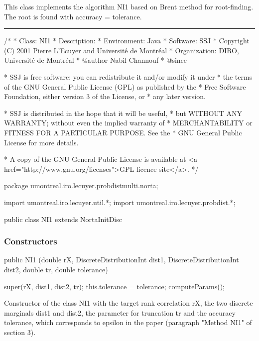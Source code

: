  This class implements the algorithm NI1 based on Brent method for
root-finding. The root is found with accuracy = tolerance.
\bigskip\hrule

\begin{code}
\begin{hide}
/*
 * Class:        NI1
 * Description:
 * Environment:  Java
 * Software:     SSJ
 * Copyright (C) 2001  Pierre L'Ecuyer and Université de Montréal
 * Organization: DIRO, Université de Montréal
 * @author       Nabil Channouf
 * @since

 * SSJ is free software: you can redistribute it and/or modify it under
 * the terms of the GNU General Public License (GPL) as published by the
 * Free Software Foundation, either version 3 of the License, or
 * any later version.

 * SSJ is distributed in the hope that it will be useful,
 * but WITHOUT ANY WARRANTY; without even the implied warranty of
 * MERCHANTABILITY or FITNESS FOR A PARTICULAR PURPOSE.  See the
 * GNU General Public License for more details.

 * A copy of the GNU General Public License is available at
   <a href="http://www.gnu.org/licenses">GPL licence site</a>.
 */
\end{hide}
package umontreal.iro.lecuyer.probdistmulti.norta;
\begin{hide}
import umontreal.iro.lecuyer.util.*;
import umontreal.iro.lecuyer.probdist.*;
\end{hide}

public class NI1 extends NortaInitDisc\begin{hide}
{
   private double tolerance; /* Desired accuracy for the root-finder
   				 algorithm (epsilon in paragraph
   				 "Method NI1" of section 3 in the paper).*/
\end{hide}
\end{code}
\subsubsection* {Constructors}

\begin{code}

   public NI1 (double rX, DiscreteDistributionInt dist1,
               DiscreteDistributionInt dist2, double tr, double tolerance)\begin{hide}
   {
      super(rX, dist1, dist2, tr);
      this.tolerance = tolerance;
      computeParams();
   }\end{hide}
\end{code}
\begin{tabb}
Constructor of the class NI1 with the target rank correlation rX,
       the two discrete marginals dist1 and dist2,
       the parameter for truncation tr and the accuracy tolerance,
       which corresponds to epsilon in the paper
       (paragraph "Method NI1" of section 3).
\end{tabb}

